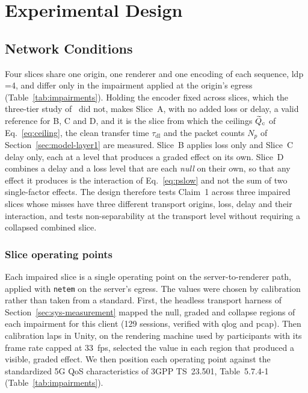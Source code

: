 \section{Experimental Design}
\label{sec:design}

\subsection{Network Conditions}
\label{sec:design-network}

Four slices share one origin, one renderer and one encoding of each
sequence, \gls{ldp} \gof{}=4, and differ only in the impairment
applied at the origin's egress (Table~\ref{tab:impairments}). Holding
the encoder fixed across slices, which the three-tier study
of~\cite{mosaic2026} did not, makes Slice~A, with no added loss or delay, a valid reference
for B, C and D, and it is the slice from which the ceilings $\widetilde{Q}_c$ of
Eq.~\eqref{eq:ceiling}, the clean transfer time $\tau_{\mathrm{dl}}$
and the packet counts $N_p$ of Section~\ref{sec:model-layer1} are
measured. Slice~B applies loss only and Slice~C delay only, each at a
level that produces a graded effect on its own. Slice~D combines a
delay and a loss level that are each \emph{null} on their own, so that
any effect it produces is the interaction of Eq.~\eqref{eq:pslow} and
not the sum of two single-factor effects. The design therefore tests
Claim~1 across three impaired slices whose misses have three different
transport origins, loss, delay and their interaction, and tests
non-separability at the transport level without requiring a
collapsed combined slice. 

\subsubsection{Slice operating points}
\label{sec:calibration}
Each impaired slice is a single operating point on the
server-to-renderer path, applied with \texttt{netem} on the server's
egress. The values were chosen by calibration rather than taken from
a standard. First, the headless transport harness of
Section~\ref{sec:sys-measurement} mapped the null, graded and
collapse regions of each impairment for this client (129 sessions,
verified with qlog and pcap). Then calibration laps in Unity, on the
rendering machine used by participants with its frame rate capped at
\SI{33}{fps}, selected the value in each region that produced a
visible, graded effect. We then position each operating point against
the standardized 5G QoS characteristics of 3GPP TS~23.501,
Table~5.7.4-1~\cite{3gpp23501} (Table~\ref{tab:impairments}).

